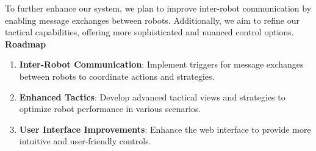 \documentclass[a4paper]{article}
\begin{document}
To further enhance our system, we plan to improve inter-robot communication by enabling message exchanges between robots. 
Additionally, we aim to refine our tactical capabilities, offering more sophisticated and nuanced control options. \\

\textbf{Roadmap}

\begin{enumerate}
    \item \textbf{Inter-Robot Communication}: Implement triggers for message exchanges between robots to coordinate actions and strategies.
    \item \textbf{Enhanced Tactics}: Develop advanced tactical views and strategies to optimize robot performance in various scenarios.
    \item \textbf{User Interface Improvements}: Enhance the web interface to provide more intuitive and user-friendly controls.
\end{enumerate}
\end{document}
